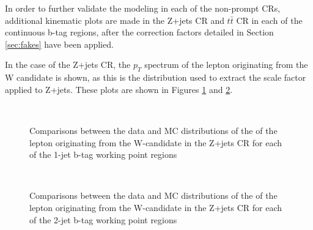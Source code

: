 
In order to further validate the modeling in each of the non-prompt CRs, additional kinematic plots are made in the Z+jets CR and $t\bar{t}$ CR in each of the continuous b-tag regions, after the correction factors detailed in Section \ref{sec:fakes} have been applied.

In the case of the Z+jets CR, the $p_T$ spectrum of the lepton originating from the W candidate is shown, as this is the distribution used to extract the scale factor applied to Z+jets. These plots are shown in Figures \ref{fig:zjets_ptW_1j} and \ref{fig:zjets_ptW_2j}.

\begin{figure}[H]
    \centering                                                                                                               
    \\
    \caption{Comparisons between the data and MC distributions of the \pt of the lepton originating from the W-candidate in the Z+jets CR for each of the 1-jet b-tag working point regions}
   \label{fig:zjets_ptW_1j}
\end{figure}

\begin{figure}[H]
    \centering
    \\
    \caption{Comparisons between the data and MC distributions of the \pt of the lepton originating from the W-candidate in the Z+jets CR for each of the 2-jet b-tag working point regions}
   \label{fig:zjets_ptW_2j}
\end{figure}


